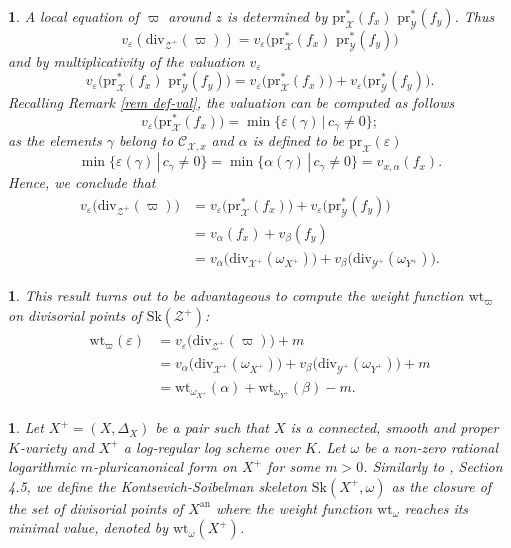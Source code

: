 \documentclass{amsart}%
\numberwithin{equation}{subsection}
\theoremstyle{plain2}
\theoremstyle{definition2}
\theoremstyle{stepstyle}
\theoremstyle{point}
\theoremstyle{subpoint}
\newtheorem{subpoint}[equation]{}%
\newcommand{\spa}[1]{\begin{subpoint}#1\end{subpoint}}           %
\newcommand{\cX}{\ensuremath{\mathscr{X}}}
\newcommand{\caC}{\ensuremath{\mathcal{C}}}
\newcommand{\cY}{\ensuremath{\mathscr{Y}}}
\newcommand{\cZ}{\ensuremath{\mathscr{Z}}}
\renewcommand{\cZ}{\ensuremath{\mathscr{Z}}}
\renewcommand{\cY}{\ensuremath{\mathscr{Y}}}
\newcommand{\pr}{\mathrm{pr}}
\newcommand{\divisor}{\mathrm{div}}
\newcommand{\weight}{\mathrm{wt}}
\newcommand{\Sk}{\mathrm{Sk}}
\begin{document}
\spa{A local equation of $\varpi$ around $z$ is determined by $\pr_{\cX}^*(f_x)\,\,\pr_{\cY}^*(f_y)$. Thus $$v_{\varepsilon}(\divisor_{\cZ^+}(\varpi))
= v_{\varepsilon}\big(\pr_{\cX}^*(f_x) \,\,\pr_{\cY}^*(f_y)\big)$$ and by multiplicativity of the valuation $v_{\varepsilon}$ $$v_{\varepsilon}\big(\pr_{\cX}^*(f_x) \,\,\pr_{\cY}^*(f_y)\big) = v_{\varepsilon}\big(\pr_{\cX}^*(f_x)\big) + v_{\varepsilon}\big(\pr_{\cY}^*(f_y)\big).$$ Recalling Remark \ref{rem def-val}, the valuation can be computed as follows $$ v_{\varepsilon}\big(\pr_{\cX}^*(f_x)\big) = \min\{\varepsilon(\gamma)\,|\,c_\gamma \neq 0\};$$ as the elements $\gamma$ belong to $\caC_{\cX,x}$ and $\alpha$ is defined to be $\pr_{\cX}(\varepsilon)$ $$\min\{\varepsilon(\gamma)\,|\,c_\gamma \neq 0\} = \min\{\alpha(\gamma)\,|\,c_\gamma \neq 0\} =  v_{x,\alpha}(f_x).$$ Hence, we conclude that \begin{align*}
v_{\varepsilon}\big(\divisor_{\cZ^+}(\varpi)\big)
& = v_{\varepsilon}\big(\pr_{\cX}^*(f_x)\big) + v_{\varepsilon}\big(\pr_{\cY}^*(f_y)\big)\\
& = v_{\alpha}(f_x) + v_{\beta}(f_y) \\
& = v_{\alpha}\big(\divisor_{\cX^+}(\omega_{X^+})\big) + v_{\beta}\big(\divisor_{\cY^+}(\omega_{Y^+})\big).
\end{align*}
}

\spa{This result turns out to be advantageous to compute the weight function $\weight_\varpi$ on divisorial points of $\Sk(\cZ^+)$: 
\begin{align} \label{equ weight function product}
\begin{split}
\weight_\varpi(\varepsilon)
& = v_{\varepsilon}\big(\divisor_{\cZ^+}(\varpi)\big) +m \\
& = v_{\alpha}\big(\divisor_{\cX^+}(\omega_{X^+})\big) + v_{\beta}\big(\divisor_{\cY^+}(\omega_{Y^+})\big) + m \\
& = \weight_{\omega_{X^+}}(\alpha) + \weight_{\omega_{Y^+}}(\beta) - m.
\end{split}
\end{align}
}

\spa{Let $X^+=(X,\Delta_X)$ be a pair such that $X$ is a connected, smooth and proper $K$-variety and $X^+$ a log-regular log scheme over $K$. Let $\omega$ be a non-zero rational logarithmic $m$-pluricanonical form on $X^+$ for some $m>0$. Similarly to \cite{MustataNicaise}, Section 4.5, we define the Kontsevich-Soibelman skeleton $\Sk(X^+, \omega)$ as the closure of the set of divisorial points of $X^\text{an}$ where the weight function $\weight_\omega$ reaches its minimal value, denoted by $\weight_{\omega}(X^+)$.}
\end{document}
